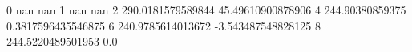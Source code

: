 0 nan nan
1 nan nan
2 290.0181579589844 45.49610900878906
4 244.90380859375 0.3817596435546875
6 240.9785614013672 -3.543487548828125
8 244.5220489501953 0.0
